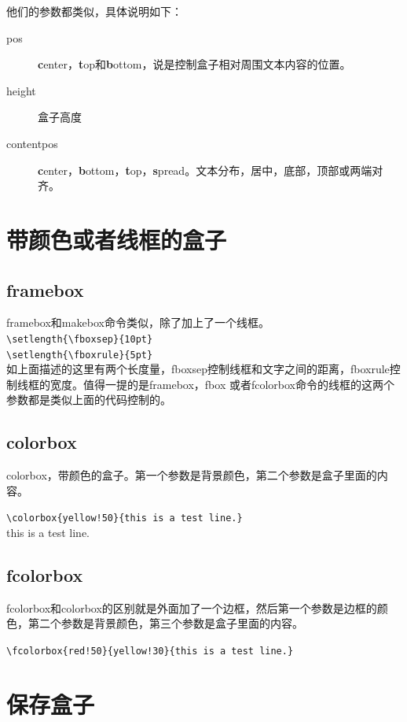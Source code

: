 \documentclass[11pt,oneside]{book}
\begin{document}
他们的参数都类似，具体说明如下：
\begin{description}
\item[pos] \textbf{c}enter，\textbf{t}op和\textbf{b}ottom，说是控制盒子相对周围文本内容的位置。
\item[height] 盒子高度
\item[contentpos] \textbf{c}enter，\textbf{b}ottom，\textbf{t}op，\textbf{s}pread。文本分布，居中，底部，顶部或两端对齐。
\end{description}


\section{带颜色或者线框的盒子}
\subsection{framebox}
framebox和makebox命令类似，除了加上了一个线框。\\
\verb+\setlength{\fboxsep}{10pt}+\\
\verb+\setlength{\fboxrule}{5pt}+\\
如上面描述的这里有两个长度量，fboxsep控制线框和文字之间的距离，fboxrule控制线框的宽度。值得一提的是framebox，fbox 或者fcolorbox命令的线框的这两个参数都是类似上面的代码控制的。


\subsection{colorbox}
colorbox，带颜色的盒子。第一个参数是背景颜色，第二个参数是盒子里面的内容。

\verb+\colorbox{yellow!50}{this is a test line.}+\\
\colorbox{yellow!50}{this is a test line.}

\subsection{fcolorbox}
fcolorbox和colorbox的区别就是外面加了一个边框，然后第一个参数是边框的颜色，第二个参数是背景颜色，第三个参数是盒子里面的内容。

\verb+\fcolorbox{red!50}{yellow!30}{this is a test line.}+\\



\section{保存盒子}
\end{document}
